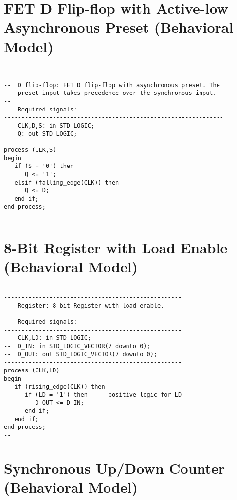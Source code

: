 \section{FET D Flip-flop with Active-low Asynchronous Preset (Behavioral Model)}

\noindent
\begin{minipage}{0.99\linewidth}
\begin{lstlisting}

---------------------------------------------------------------
--  D flip-flop: FET D flip-flop with asynchronous preset. The 
--  preset input takes precedence over the synchronous input.
--
--  Required signals: 
---------------------------------------------------------------
--  CLK,D,S: in STD_LOGIC;
--  Q: out STD_LOGIC;
---------------------------------------------------------------
process (CLK,S) 
begin
   if (S = '0') then 
      Q <= '1'; 
   elsif (falling_edge(CLK)) then  
      Q <= D;
   end if;
end process;
--
\end{lstlisting}
\end{minipage}

\section{8-Bit Register with Load Enable (Behavioral Model)}

\noindent
\begin{minipage}{0.99\linewidth}
\begin{lstlisting}

---------------------------------------------------
--  Register: 8-bit Register with load enable. 
--
--  Required signals: 
---------------------------------------------------
--  CLK,LD: in STD_LOGIC;
--  D_IN: in STD_LOGIC_VECTOR(7 downto 0);
--  D_OUT: out STD_LOGIC_VECTOR(7 downto 0);
---------------------------------------------------
process (CLK,LD) 
begin
   if (rising_edge(CLK)) then  
      if (LD = '1') then   -- positive logic for LD
         D_OUT <= D_IN;
      end if;
   end if;
end process;
--
\end{lstlisting}
\end{minipage}

\section{Synchronous Up/Down Counter (Behavioral Model)}

